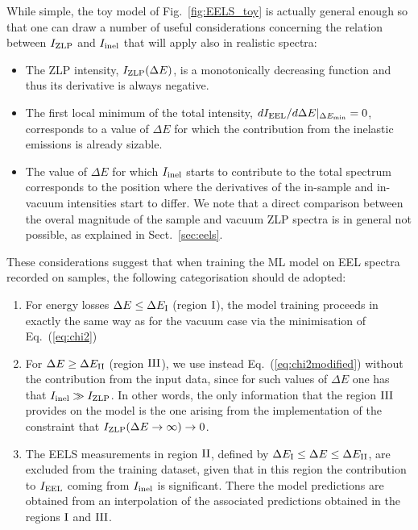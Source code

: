 While simple, the toy model of Fig.~\ref{fig:EELS_toy} is actually general enough so that one can draw
a number of useful considerations concerning the relation between $I_{\rm ZLP}$ and $I_{\rm inel}$
that will apply also in realistic spectra:

\begin{itemize}

\item The ZLP intensity, $I_{\rm ZLP}(\Delta E)$, is a monotonically decreasing function
  and thus its derivative is always negative.

\item  The first local minimum of the total intensity, $dI_{\rm EEL}/d\Delta E|_{\Delta E_{\rm min}}=0$, corresponds
  to a value of $\Delta E$ for which the contribution from the inelastic emissions is already
  sizable.

\item The value of $\Delta E$ for which $I_{\rm inel}$ starts to contribute to the total spectrum
  corresponds to the position where the derivatives of the in-sample and in-vacuum intensities
  start to differ.
  We note that a direct comparison between the overal magnitude of the sample and vacuum ZLP
  spectra is in general not possible, as explained in Sect.~\ref{sec:eels}. 
\end{itemize}

These considerations suggest that when training the ML model on EEL spectra recorded on samples,
the following categorisation should de adopted:

\begin{enumerate}

\item For energy losses $\Delta E \le \Delta E_{\rm I}$ (region $\rm I$),
  the model training  proceeds in exactly the same way as for the vacuum case
  via the minimisation of Eq.~(\ref{eq:chi2})

\item  
  For $\Delta E \ge \Delta E_{\rm II}$ (region $\rm III$), we use instead Eq.~(\ref{eq:chi2modified})
  without the contribution from the input data, since for such values
  of $\Delta E$ one has that $I_{\rm inel}\gg I_{\rm ZLP}$.
  In other words, the only information that the region $\rm III$ provides
  on the model is the one arising from the implementation
  of the constraint that $I_{\rm ZLP}(\Delta E\to \infty)\to 0$.

\item The EELS measurements  in region $\rm II$, defined by  $\Delta E_{\rm I} \le \Delta E \le \Delta E_{\rm II}$,
  are excluded from the training dataset, given that in this region the contribution to $I_{\rm EEL}$
  coming from $I_{\rm inel}$ is significant.
  There the model predictions are obtained from an interpolation
  of the associated predictions obtained in the regions $\rm I$ and $\rm III$.

\end{enumerate}

